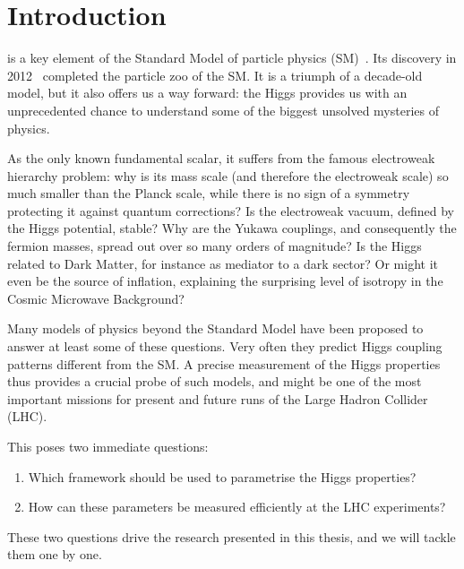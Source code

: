 

\chapter{Introduction}
\label{chapter:Introduction}

\cite{Higgs:1964ia, Higgs:1964pj,
  Englert:1964et} is a key element of the Standard Model of particle
physics (SM)~\cite{Glashow:1961tr, Weinberg:1967tq, Salam:1968rm}. Its
discovery in 2012~\cite{Aad:2012tfa, Chatrchyan:2012xdj} completed the
particle zoo of the SM. It is a triumph of a decade-old model, but it
also offers us a way forward: the Higgs provides us with an
unprecedented chance to understand some of the biggest unsolved
mysteries of physics.

As the only known fundamental scalar, it suffers from the famous
electroweak hierarchy problem: why is its mass scale (and therefore
the electroweak scale) so much smaller than the Planck scale, while
there is no sign of a symmetry protecting it against quantum
corrections? Is the electroweak vacuum, defined by the Higgs
potential, stable?  Why are the Yukawa couplings, and consequently the
fermion masses, spread out over so many orders of magnitude?  Is the
Higgs related to Dark Matter, for instance as mediator to a dark
sector? Or might it even be the source of inflation, explaining the
surprising level of isotropy in the Cosmic Microwave Background?

Many models of physics beyond the Standard Model have been proposed to
answer at least some of these questions. Very often they predict Higgs
coupling patterns different from the SM. A precise measurement of the
Higgs properties thus provides a crucial probe of such models, and
might be one of the most important missions for present and future
runs of the Large Hadron Collider (LHC).

This poses two immediate questions:
%
\begin{enumerate}
\item Which framework should be used to parametrise the Higgs
  properties?
\item How can these parameters be measured efficiently at the LHC
  experiments?
\end{enumerate}
%
These two questions drive the research presented in this thesis, and
we will tackle them one by one.

